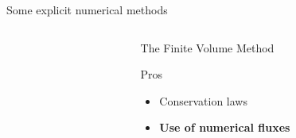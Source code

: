 \begin{withoutheadline}
\begin{frame}{Some explicit numerical methods}
\begin{overprint}
      \begin{columns}
        \begin{column}{0.49\textwidth}
          \vspace{-0.1cm}
          \centering
          
        \end{column}
        \begin{column}{0.49\textwidth}
          \begin{block}{The Finite Volume Method \cite{Leveque}}
            \begin{footnotesize}
              \begin{block}{\footnotesize Pros}
                \vspace{-0.2cm}
                \begin{itemize}
                \item[] Conservation laws %
                \item[] \textbf{Use of numerical fluxes} \cite{Godunov_method,Thomas_EP}

\end{itemize}
\end{block}
\end{footnotesize}
\end{block}
\end{column}
\end{columns}
\end{overprint}
\end{frame}
\end{withoutheadline}
